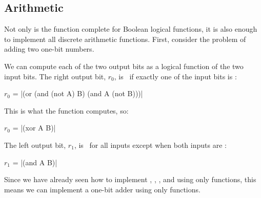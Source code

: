 \begin{schemeregion}

\subsection{Arithmetic}\label{sec:binaryarithmetic}

Not only is the  function complete for Boolean logical functions, it is also enough to implement all discrete arithmetic functions.  
First, consider the problem of adding two one-bit numbers.  


We can compute each of the two output bits as a logical function of the two input bits.  The right output bit, $r_0$, is \bI\ if exactly one of the input bits is \bI:
\begin{center}
$r_0$ = \scheme|(or (and (not A) B) (and A (not B)))|
\end{center}
This is what the  function computes, so:
\begin{center}
$r_0$ = \scheme|(xor A B)|
\end{center}

The left output bit, $r_1$, is \bO\ for all inputs except when both inputs are \bI:
\begin{center}
$r_1$ = \scheme|(and A B)|
\end{center}
Since we have already seen how to implement , , , and  using only  functions, this means we can implement a one-bit adder using only  functions.


\end{schemeregion}
